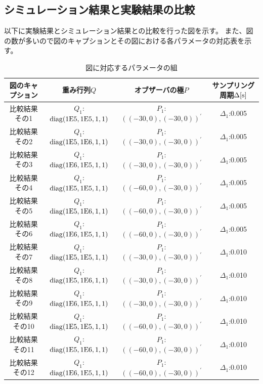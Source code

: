 	\subsection{シミュレーション結果と実験結果の比較}
	以下に実験結果とシミュレーション結果との比較を行った図を示す。
	また、図の数が多いので図のキャプションとその図における各パラメータの対応表を示す。
	\begin{table}[H]
		\begin{center}
			\caption{図に対応するパラメータの組}
			\begin{tabular}{|c|c|c|c|}\hline
				図のキャプション & 重み行列$Q$ & オブザーバの極$P$ & サンプリング周期$\Delta[\rm{s}]$ \\ \hline\hline
				比較結果その1 & $Q_1$:$\rm{diag}(1E5,1E5,1,1)$ & $P_1$:$((-30,0),(-30,0))^{'}$ & $\Delta_1$:0.005 \\ \hline
				比較結果その2 & $Q_1$:$\rm{diag}(1E5,1E6,1,1)$ & $P_1$:$((-30,0),(-30,0))^{'}$ & $\Delta_1$:0.005 \\ \hline
				比較結果その3 & $Q_1$:$\rm{diag}(1E6,1E5,1,1)$ & $P_1$:$((-30,0),(-30,0))^{'}$ & $\Delta_1$:0.005 \\ \hline
				比較結果その4 & $Q_1$:$\rm{diag}(1E5,1E5,1,1)$ & $P_1$:$((-60,0),(-30,0))^{'}$ & $\Delta_1$:0.005 \\ \hline
				比較結果その5 & $Q_1$:$\rm{diag}(1E5,1E6,1,1)$ & $P_1$:$((-60,0),(-30,0))^{'}$ & $\Delta_1$:0.005 \\ \hline
				比較結果その6 & $Q_1$:$\rm{diag}(1E6,1E5,1,1)$ & $P_1$:$((-60,0),(-30,0))^{'}$ & $\Delta_1$:0.005 \\ \hline
				比較結果その7 & $Q_1$:$\rm{diag}(1E5,1E5,1,1)$ & $P_1$:$((-30,0),(-30,0))^{'}$ & $\Delta_1$:0.010 \\ \hline
				比較結果その8 & $Q_1$:$\rm{diag}(1E5,1E6,1,1)$ & $P_1$:$((-30,0),(-30,0))^{'}$ & $\Delta_1$:0.010 \\ \hline
				比較結果その9 & $Q_1$:$\rm{diag}(1E6,1E5,1,1)$ & $P_1$:$((-30,0),(-30,0))^{'}$ & $\Delta_1$:0.010 \\ \hline
				比較結果その10 & $Q_1$:$\rm{diag}(1E5,1E5,1,1)$ & $P_1$:$((-60,0),(-30,0))^{'}$ & $\Delta_1$:0.010 \\ \hline
				比較結果その11 & $Q_1$:$\rm{diag}(1E5,1E6,1,1)$ & $P_1$:$((-60,0),(-30,0))^{'}$ & $\Delta_1$:0.010 \\ \hline
				比較結果その12 & $Q_1$:$\rm{diag}(1E6,1E5,1,1)$ & $P_1$:$((-60,0),(-30,0))^{'}$ & $\Delta_1$:0.010 \\ \hline
			\end{tabular}
		\end{center}
		\label{table:huriage_control}
	\end{table}
	
